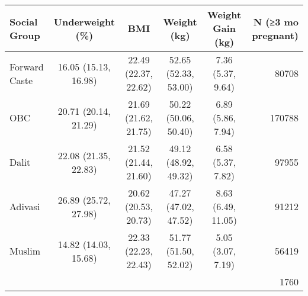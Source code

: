 \begin{tabular}{lccccr}
\toprule
Social Group & Underweight (\%) & BMI & Weight (kg) & Weight Gain (kg) & N (≥3 mo pregnant) \\
\midrule
Forward Caste&16.05 (15.13, 16.98)&22.49 (22.37, 22.62)&52.65 (52.33, 53.00)&7.36 (5.37, 9.64)&80708\\
OBC&20.71 (20.14, 21.29)&21.69 (21.62, 21.75)&50.22 (50.06, 50.40)&6.89 (5.86, 7.94)&170788\\
Dalit&22.08 (21.35, 22.83)&21.52 (21.44, 21.60)&49.12 (48.92, 49.32)&6.58 (5.37, 7.82)&97955\\
Adivasi&26.89 (25.72, 27.98)&20.62 (20.53, 20.73)&47.27 (47.02, 47.52)&8.63 (6.49, 11.05)&91212\\
Muslim&14.82 (14.03, 15.68)&22.33 (22.23, 22.43)&51.77 (51.50, 52.02)&5.05 (3.07, 7.19)&56419\\
&&&&&1760\\
\bottomrule
\end{tabular}
